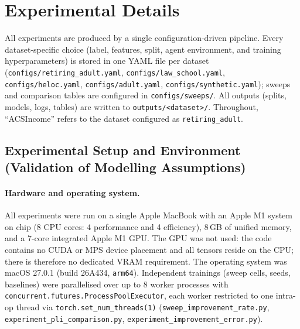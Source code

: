 
\section{Experimental Details}
\label{app:experimental-details}

All experiments are produced by a single configuration-driven pipeline. Every
dataset-specific choice (label, features, split, agent environment, and
training hyperparameters) is stored in one YAML file per dataset
(\texttt{configs/retiring\_adult.yaml}, \texttt{configs/law\_school.yaml},
\texttt{configs/heloc.yaml}, \texttt{configs/adult.yaml},
\texttt{configs/synthetic.yaml}); sweeps and comparison tables are configured
in \texttt{configs/sweeps/}. All outputs (splits, models, logs, tables) are
written to \texttt{outputs/<dataset>/}. Throughout, ``ACSIncome'' refers to the
dataset configured as \texttt{retiring\_adult}.

\subsection{Experimental Setup and Environment (Validation of Modelling Assumptions)}
\label{app:setup}

\paragraph{Hardware and operating system.}
All experiments were run on a single Apple MacBook with an Apple M1 system on
chip (8 CPU cores: 4 performance and 4 efficiency), 8\,GB of unified memory,
and a 7-core integrated Apple M1 GPU. The GPU was not used: the code contains no
CUDA or MPS device placement and all tensors reside on the CPU; there is
therefore no dedicated VRAM requirement. The operating system was macOS 27.0.1
(build 26A434, \texttt{arm64}). Independent trainings (sweep cells, seeds,
baselines) were parallelised over up to 8 worker processes with
\texttt{concurrent.futures.ProcessPoolExecutor}, each worker restricted to one
intra-op thread via \texttt{torch.set\_num\_threads(1)}
(\texttt{sweep\_improvement\_rate.py}, \texttt{experiment\_pli\_comparison.py},
\texttt{experiment\_improvement\_error.py}).

